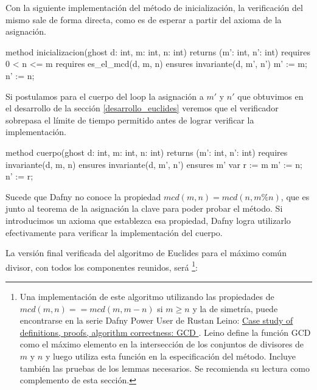 \documentclass[12pt, a4paper, openany, fleqn]{book}
\begin{document}
    Con la siguiente implementación del método de inicialización, la verificación del mismo sale de forma directa, como es de esperar a partir del axioma de la asignación.

    \begin{dafny}
method inicializacion(ghost d: int, m: int, n: int)
    returns (m': int, n': int)
    requires 0 < n <= m
    requires es_el_mcd(d, m, n)
    ensures invariante(d, m', n')
    {
        m' := m;
        n' := n;
    }
    \end{dafny}

    Si postulamos para el cuerpo del loop la asignación a $m'$ y $n'$ que obtuvimos en el desarrollo de la sección \ref{desarrollo_euclides} veremos que el verificador sobrepasa el límite de tiempo permitido antes de lograr verificar la implementación.

    \begin{dafny}
method cuerpo(ghost d: int, m: int, n: int)
    returns (m': int, n': int)
    requires invariante(d, m, n)
    ensures invariante(d, m', n')
    ensures m' %
{
    var r := m %
    m' := n;
    n' := r;
}
    \end{dafny}

    Sucede que Dafny no conoce la propiedad $mcd(m, n) = mcd(n, m\%n)$, que es junto al teorema de la asignación la clave para poder probar el método. Si introducimos un axioma que establezca esa propiedad, Dafny logra utilizarlo efectivamente para verificar la implementación del cuerpo.


    La versión final verificada del algoritmo de Euclides para el máximo común divisor, con todos los componentes reunidos, será \footnote{
    Una implementación de este algoritmo utilizando las propiedades de $mcd(m, n) == mcd(m, m - n)$ si $m \ge n$ y la de simetría, puede encontrarse en la serie Dafny Power User de Rustan Leino: \href{https://leino.science/papers/krml279.html}{Case study of definitions, proofs, algorithm correctness: GCD
    }. Leino define la función GCD como el máximo elemento en la intersección de los conjuntos de divisores de $m$ y $n$ y luego utiliza esta función en la especificación del método. Incluye también las pruebas de los lemmas necesarios. Se recomienda su lectura como complemento de esta sección.}:
\end{document}
